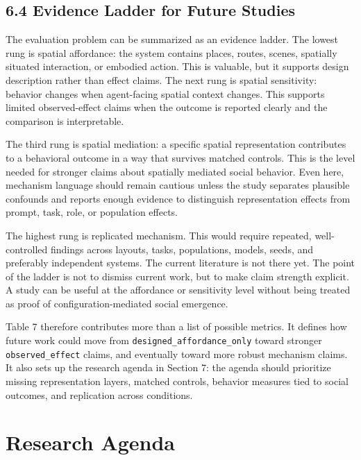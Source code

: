 \documentclass[
  twocolumn]{article}
\begin{document}
\subsection{6.4 Evidence Ladder for Future
Studies}\label{evidence-ladder-for-future-studies}

The evaluation problem can be summarized as an evidence ladder. The
lowest rung is spatial affordance: the system contains places, routes,
scenes, spatially situated interaction, or embodied action. This is
valuable, but it supports design description rather than effect claims.
The next rung is spatial sensitivity: behavior changes when agent-facing
spatial context changes. This supports limited observed-effect claims
when the outcome is reported clearly and the comparison is
interpretable.

The third rung is spatial mediation: a specific spatial representation
contributes to a behavioral outcome in a way that survives matched
controls. This is the level needed for stronger claims about spatially
mediated social behavior. Even here, mechanism language should remain
cautious unless the study separates plausible confounds and reports
enough evidence to distinguish representation effects from prompt, task,
role, or population effects.

The highest rung is replicated mechanism. This would require repeated,
well-controlled findings across layouts, tasks, populations, models,
seeds, and preferably independent systems. The current literature is not
there yet. The point of the ladder is not to dismiss current work, but
to make claim strength explicit. A study can be useful at the affordance
or sensitivity level without being treated as proof of
configuration-mediated social emergence.

Table 7 therefore contributes more than a list of possible metrics. It
defines how future work could move from
\texttt{designed\_affordance\_only} toward stronger
\texttt{observed\_effect} claims, and eventually toward more robust
mechanism claims. It also sets up the research agenda in Section 7: the
agenda should prioritize missing representation layers, matched
controls, behavior measures tied to social outcomes, and replication
across conditions.

\section{Research Agenda}\label{research-agenda}
\end{document}
